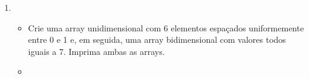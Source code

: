 \documentclass[letterpaper,10pt,english]{jupyterBook}
\begin{document}
\begin{enumerate}
\begin{itemize}
\begin{sphinxVerbatim}[commandchars=\\\{\}]
    
\end{sphinxVerbatim}

\sphinxAtStartPar
{}

\begin{sphinxVerbatim}[commandchars=\\\{\}]
   
\PYG{p}{[}        \PYG{p}{]}
\end{sphinxVerbatim}

\item {} 
\sphinxAtStartPar
{}

\begin{sphinxVerbatim}[commandchars=\\\{\}]
   
\end{sphinxVerbatim}

\sphinxAtStartPar
{}

\begin{sphinxVerbatim}[commandchars=\\\{\}]
 
\end{sphinxVerbatim}

\end{itemize}

\item {} 
\sphinxAtStartPar
{}
\begin{itemize}
\item {} 
\sphinxAtStartPar
{} Crie uma array unidimensional com 6 elementos espaçados uniformemente entre 0 e 1 e, em seguida, uma array bidimensional com valores todos iguais a 7. Imprima ambas as arrays.

\item {} 
\sphinxAtStartPar
{}

\begin{sphinxVerbatim}[commandchars=\\\{\}]
    
\end{sphinxVerbatim}


\end{itemize}
\end{enumerate}
\end{document}

